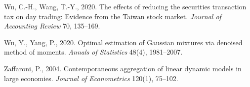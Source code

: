 \documentclass[11pt,letterpaper]{article}
\theoremstyle{definition}
\begin{document}
\begin{list}{}{\footnotesize\linespread{0.89}\selectfont\setlength{\leftmargin}{1.3em}\setlength{\itemindent}{-1.8em}\setlength{\itemsep}{0pt}\setlength{\parsep}{0pt}}
\item Wu, C.-H., Wang, T.-Y., 2020. The effects of reducing the securities transaction tax on day trading: Evidence from the Taiwan stock market. \emph{Journal of Accounting Review} 70, 135--169.

\item Wu, Y., Yang, P., 2020. Optimal estimation of Gaussian mixtures via denoised method of moments. \emph{Annals of Statistics} 48(4), 1981--2007.

\item Zaffaroni, P., 2004. Contemporaneous aggregation of linear dynamic models in large economies. \emph{Journal of Econometrics} 120(1), 75--102.

\end{list}
\end{document}

